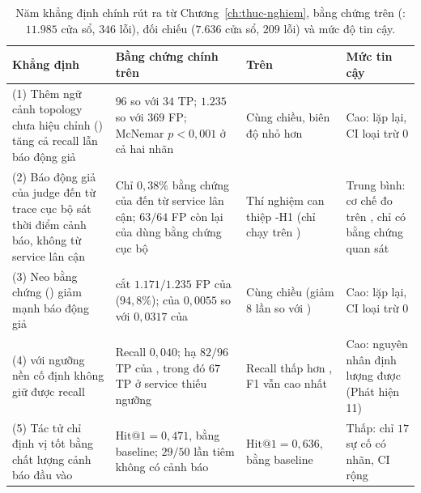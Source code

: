 \begin{table}[H]
  \centering
  \caption[Năm khẳng định chính và mức độ tin cậy]{Năm khẳng định chính rút ra từ Chương~\ref{ch:thuc-nghiem}, bằng chứng trên  (: $11.985$ cửa sổ, $346$ lỗi), đối chiếu  ($7.636$ cửa sổ, $209$ lỗi) và mức độ tin cậy.}
  \label{tab:ch7-tong-hop}
  \tblfont
  \tblsetup
  \setlength{\tabcolsep}{3.5pt}
  \begin{tabularx}{\linewidth}{|>{\raggedright\arraybackslash}p{3.4cm}|Y|>{\raggedright\arraybackslash}p{2.7cm}|>{\raggedright\arraybackslash}p{2.6cm}|}
    \hline
    \textbf{Khẳng định} & \textbf{Bằng chứng chính trên } & \textbf{Trên } & \textbf{Mức tin cậy} \\
    \hline
    (1) Thêm ngữ cảnh topology chưa hiệu chỉnh () tăng cả recall lẫn báo động giả & $96$ so với $34$ TP; $1.235$ so với $369$ FP; McNemar $p < 0{,}001$ ở cả hai nhãn & Cùng chiều, biên độ nhỏ hơn & Cao: lặp lại, CI loại trừ $0$ \\
    \hline
    (2) Báo động giả của judge đến từ trace cục bộ sát thời điểm cảnh báo, không từ service lân cận & Chỉ $0{,}38\%$ bằng chứng của  đến từ service lân cận; $63/64$ FP còn lại của \CTAV{} dùng bằng chứng cục bộ & Thí nghiệm can thiệp \hyp{H1} (chỉ chạy trên ) & Trung bình: cơ chế đo trên ,  chỉ có bằng chứng quan sát \\
    \hline
    (3) Neo bằng chứng () giảm mạnh báo động giả &  cắt $1.171/1.235$ FP của  ($94{,}8\%$);  của \CTAV{} $0{,}0055$ so với $0{,}0317$ của  & Cùng chiều (giảm  $8$ lần so với ) & Cao: lặp lại, CI loại trừ $0$ \\
    \hline
    (4) \CTAV{} với ngưỡng nền  cố định không giữ được recall & Recall $0{,}040$;  hạ $82/96$ TP của , trong đó $67$ TP ở service thiếu ngưỡng  & Recall thấp hơn , F1 vẫn cao nhất & Cao: nguyên nhân định lượng được (Phát hiện 11) \\
    \hline
    (5) Tác tử  chỉ định vị tốt bằng chất lượng cảnh báo đầu vào & $\text{Hit@1} = 0{,}471$, bằng baseline; $29/50$ lần tiêm không có cảnh báo & $\text{Hit@1} = 0{,}636$, bằng baseline & Thấp: chỉ $17$ sự cố có nhãn, CI rộng \\
    \hline
  \end{tabularx}
\end{table}

